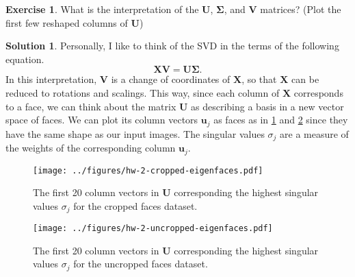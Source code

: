 \documentclass[12pt]{article}
\renewcommand{\vec}[1]{\mathbf{#1}}
\theoremstyle{definition}
\newtheorem{exer}{Exercise}
\newtheorem{sol}{Solution}
\theoremstyle{remark}
\begin{document}
\begin{exer}
    What is the interpretation of the $\vec{U}$, $\vec{\Sigma}$, and $\vec{V}$ matrices? (Plot the first few reshaped columns of $\vec{U}$)
\end{exer}
\begin{sol}
    Personally, I like to think of the SVD in the terms of the following equation.
    \begin{equation}
        \vec{XV} = \vec{U}\vec{\Sigma}.
    \end{equation}
    In this interpretation, $\vec{V}$ is a change of coordinates of $\vec{X}$, so that $\vec{X}$ can be reduced to rotations and scalings. This way, since each column of $\vec{X}$ corresponds to a face, we can think about the matrix $\vec{U}$ as describing a basis in a new vector space of faces. We can plot its column vectors $\vec{u}_j$ as faces as in \cref{fig:cropped_eigenfaces} and \cref{fig:uncropped_eigenfaces} since they have the same shape as our input images. The singular values $\sigma_j$ are a measure of the weights of the corresponding column $\vec{u}_j$. 
    \begin{figure}[h]
        \centering
        \texttt{[image: ../figures/hw-2-cropped-eigenfaces.pdf]}
        \caption{The first 20 column vectors in $\vec{U}$ corresponding the highest singular values $\sigma_j$ for the cropped faces dataset. }
        \label{fig:cropped_eigenfaces}
    \end{figure}

    \begin{figure}[h]
        \centering
        \texttt{[image: ../figures/hw-2-uncropped-eigenfaces.pdf]}
        \caption{The first 20 column vectors in $\vec{U}$ corresponding the highest singular values $\sigma_j$ for the uncropped faces dataset. }
        \label{fig:uncropped_eigenfaces}
    \end{figure}
\end{sol}

\newpage
\end{document}
